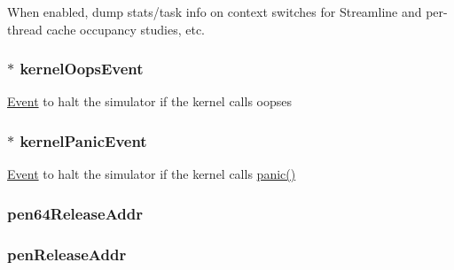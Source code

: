 \label{classLinuxArmSystem_a4f36b860c5380f4fc20e37e283fd8a1b}
When enabled, dump stats/task info on context switches for Streamline and per-\/thread cache occupancy studies, etc. \hypertarget{classLinuxArmSystem_a34ff17256dac7f50230fa2647f283d8b}{
\subsubsection[{kernelOopsEvent}]{$\ast$ {\bf kernelOopsEvent}}}
\label{classLinuxArmSystem_a34ff17256dac7f50230fa2647f283d8b}
\hyperlink{classEvent}{Event} to halt the simulator if the kernel calls oopses \hypertarget{classLinuxArmSystem_a06483304d3fd0e7aa71e46d602fd8fca}{
\subsubsection[{kernelPanicEvent}]{$\ast$ {\bf kernelPanicEvent}}}
\label{classLinuxArmSystem_a06483304d3fd0e7aa71e46d602fd8fca}
\hyperlink{classEvent}{Event} to halt the simulator if the kernel calls \hyperlink{base_2misc_8hh_a1445e207e36c97ff84c54b47288cea19}{panic()} \hypertarget{classLinuxArmSystem_a013c7886af50b6686a3146af9a3ea898}{
\subsubsection[{pen64ReleaseAddr}]{ {\bf pen64ReleaseAddr}}}
\label{classLinuxArmSystem_a013c7886af50b6686a3146af9a3ea898}
\hypertarget{classLinuxArmSystem_a38de836fdda5d23ffd25ffbd1a1faa74}{
\subsubsection[{penReleaseAddr}]{ {\bf penReleaseAddr}}}
